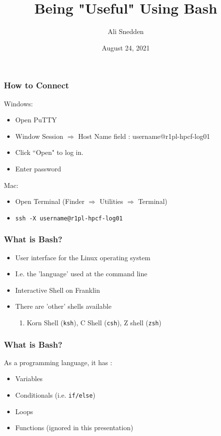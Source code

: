 \documentclass{beamer}
\title{Being "Useful" Using Bash}
\author{Ali Snedden}
\institute{Nationwide Children's Hospital}
\date{August 24, 2021}
\newcommand{\code}[1]{\colorbox{codegray}{\texttt{#1}}}
\begin{document}
 
\frame{\titlepage}




\begin{frame}
\frametitle{How to Connect}
Windows:
\begin{itemize}
    \item Open PuTTY
    \item Window Session $\Rightarrow$ Host Name field : username@r1pl-hpcf-log01
    \item Click ``Open" to log in.
    \item Enter password
\end{itemize}

Mac:
\begin{itemize}
    \item Open Terminal (Finder $\Rightarrow$ Utilities $\Rightarrow$ Terminal)
    \item \code{ssh -X username@r1pl-hpcf-log01}
\end{itemize}
\end{frame}



\begin{frame}
\frametitle{What is Bash?}
\begin{itemize}
    \item User interface for the Linux operating system
    \pause
    \item I.e. the 'language' used at the command line
    \pause
    \item Interactive Shell on Franklin
    \pause
    \item There are 'other' shells available
    \begin{enumerate}
        \item Korn Shell (\code{ksh}), C Shell (\code{csh}), Z shell (\code{zsh})
    \end{enumerate}
\end{itemize}
\end{frame}


\begin{frame}
\frametitle{What is Bash?}
As a programming language, it has :
\begin{itemize}
    \item Variables 
    \pause
    \item Conditionals (i.e. \code{if/else})
    \pause
    \item Loops 
    \pause
    \item Functions (ignored in this presentation)
\end{itemize}
\end{frame}
\end{document}
